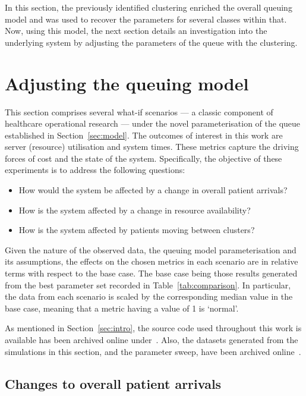In this section, the previously identified clustering enriched the overall
queuing model and was used to recover the parameters for several classes within
that. Now, using this model, the next section details an investigation into the
underlying system by adjusting the parameters of the queue with the clustering.

\section{Adjusting the queuing model}\label{sec:scenarios}

This section comprises several what-if scenarios --- a classic component of
healthcare operational research --- under the novel parameterisation of the
queue established in Section~\ref{sec:model}. The outcomes of interest in this
work are server (resource) utilisation and system times. These metrics capture
the driving forces of cost and the state of the system. Specifically, the
objective of these experiments is to address the following questions:
\begin{itemize}
    \item How would the system be affected by a change in overall patient
        arrivals?
    \item How is the system affected by a change in resource availability?
    \item How is the system affected by patients moving between clusters?
\end{itemize}

Given the nature of the observed data, the queuing model parameterisation and
its assumptions, the effects on the chosen metrics in each scenario are in
relative terms with respect to the base case. The base case being those results
generated from the best parameter set recorded in Table~\ref{tab:comparison}. In
particular, the data from each scenario is scaled by the corresponding median
value in the base case, meaning that a metric having a value of 1 is `normal'.

As mentioned in Section~\ref{sec:intro}, the source code used throughout this
work is available has been archived online under~.
Also, the datasets generated from the simulations in this section, and the
parameter sweep, have been archived online~.


\subsection{Changes to overall patient arrivals}\label{subsec:arrivals}

